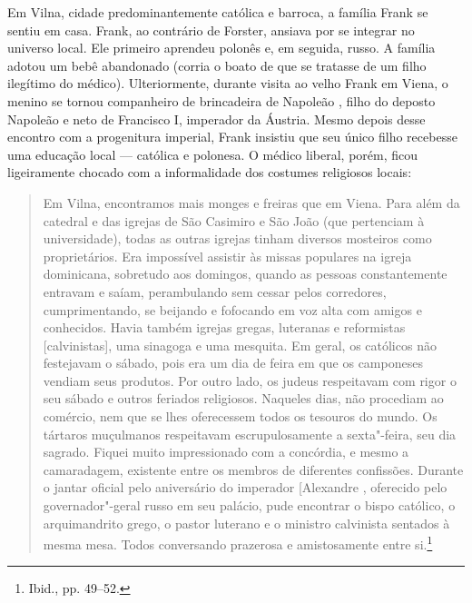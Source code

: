 Em Vilna, cidade predominantemente católica e barroca, a família Frank
se sentiu em casa. Frank, ao contrário de Forster, ansiava por se
integrar no universo local. Ele primeiro aprendeu polonês e, em seguida,
russo. A família adotou um bebê abandonado (corria o boato de que se
tratasse de um filho ilegítimo do médico). Ulteriormente, durante visita
ao velho Frank em Viena, o menino se tornou companheiro de brincadeira
de Napoleão , filho do deposto Napoleão e neto de Francisco I,
imperador da Áustria. Mesmo depois desse encontro com a progenitura
imperial, Frank insistiu que seu único filho recebesse uma educação
local --- católica e polonesa. O médico liberal, porém, ficou ligeiramente
chocado com a informalidade dos costumes religiosos locais:

\begin{quote}
Em Vilna, encontramos mais monges e freiras que em Viena. Para além da
catedral e das igrejas de São Casimiro e São João (que pertenciam à
universidade), todas as outras igrejas tinham diversos mosteiros como
proprietários. Era impossível assistir às missas populares na igreja
dominicana, sobretudo aos domingos, quando as pessoas constantemente
entravam e saíam, perambulando sem cessar pelos corredores,
cumprimentando, se beijando e fofocando em voz alta com amigos e
conhecidos. Havia também igrejas gregas, luteranas e reformistas
{[}calvinistas{]}, uma sinagoga e uma mesquita. Em geral, os católicos
não festejavam o sábado, pois era um dia de feira em que os camponeses
vendiam seus produtos. Por outro lado, os judeus respeitavam com rigor o
seu sábado e outros feriados religiosos. Naqueles dias, não procediam ao
comércio, nem que se lhes oferecessem todos os tesouros do mundo. Os
tártaros muçulmanos respeitavam escrupulosamente a sexta"-feira, seu dia
sagrado. Fiquei muito impressionado com a concórdia, e mesmo a
camaradagem, existente entre os membros de diferentes confissões.
Durante o jantar oficial pelo aniversário do imperador {[}Alexandre
\versal{I}{]}, oferecido pelo governador"-geral russo em seu palácio, pude
encontrar o bispo católico, o arquimandrito grego, o pastor luterano e o
ministro calvinista sentados à mesma mesa. Todos conversando prazerosa e
amistosamente entre si.\footnote{Ibid., pp. 49--52.}
\end{quote}

